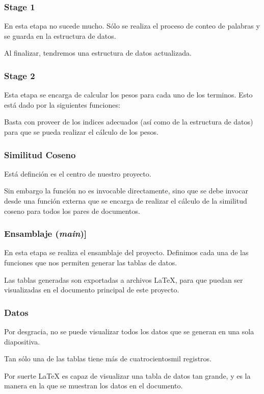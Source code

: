 \documentclass[aspectratio=169]{beamer}
\begin{document}
\begin{frame}
\frametitle{Stage 1}
En esta etapa no sucede mucho. \pause
Sólo se realiza el proceso de conteo de palabras y se guarda en la
estructura de datos. \pause

Al finalizar, tendremos una estructura de datos actualizada.
\end{frame}

\begin{frame}
\frametitle{Stage 2}
Esta etapa se encarga de calcular los pesos para cada uno de los
terminos. Esto está dado por la siguientes funciones:



\framebreak



\framebreak



\framebreak

Basta con proveer de los indices adecuados (así como de la
estructura de datos) para que se pueda realizar el cálculo de los
pesos.

\end{frame}

\begin{frame}[fragile]
\frametitle{Similitud Coseno}
Está definción es el centro de nuestro proyecto. \pause



\framebreak

Sin embargo la función no es invocable directamente, sino que se
debe invocar desde una función externa que se encarga de realizar
el cálculo de la similitud coseno para todos los pares de documentos.

\end{frame}


\begin{frame}
\frametitle{Ensamblaje (\textit{main})]}
En esta etapa se realiza el ensamblaje del proyecto. \pause
Definimos cada una de las funciones que nos permiten generar las
tablas de datos. \pause

Las tablas generadas son exportadas a archivos \LaTeX{}, para que
puedan ser visualizadas en el documento principal de este proyecto.
\end{frame}

\begin{frame}
\frametitle{Datos}
Por desgracia, no se puede visualizar todos los datos que se generan
en una sola diapositiva. \pause

Tan sólo una de las tablas tiene más de cuatrocientosmil registros. \pause

Por suerte \LaTeX{} es capaz de visualizar una tabla de datos tan grande,
y es la manera en la que se muestran los datos en el documento.
\end{frame}
\end{document}
